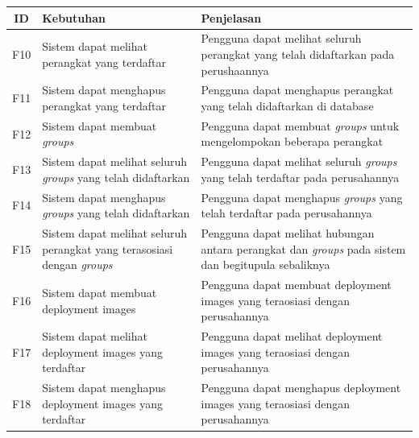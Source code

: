 \begin{table}
  \centering
  \begin{tabular}{|c|p{4.5cm}|p{8cm}|}
    \hline
    ID  & Kebutuhan                                                                      & Penjelasan                                                                                                 \\
    \hline

    \hline
    F10 & Sistem dapat melihat perangkat yang terdaftar                                  & Pengguna dapat melihat seluruh perangkat yang telah didaftarkan pada perushaannya                          \\
    \hline
    F11 & Sistem dapat menghapus perangkat yang terdaftar                                & Pengguna dapat menghapus perangkat yang telah didaftarkan di database                                      \\
    \hline
    F12 & Sistem dapat membuat \textit{groups}                                           & Pengguna dapat membuat \textit{groups} untuk mengelompokan beberapa perangkat                              \\
    \hline
    F13 & Sistem dapat melihat seluruh \textit{groups} yang telah didaftarkan            & Pengguna dapat melihat seluruh \textit{groups} yang telah terdaftar pada perusahannya                      \\
    \hline
    F14 & Sistem dapat menghapus \textit{groups} yang telah didaftarkan                  & Pengguna dapat menghapus \textit{groups} yang telah terdaftar pada perusahannya                            \\
    \hline
    F15 & Sistem dapat melihat seluruh perangkat yang terasosiasi dengan \textit{groups} & Pengguna dapat melihat hubungan antara perangkat dan \textit{groups} pada sistem dan begitupula sebaliknya \\
    \hline
    F16 & Sistem dapat membuat deployment images                                         & Pengguna dapat membuat deployment images yang teraosiasi dengan perusahannya                               \\
    \hline
    F17 & Sistem dapat melihat deployment images yang terdaftar                          & Pengguna dapat melihat deployment images yang teraosiasi dengan perusahannya                               \\
    \hline
    F18 & Sistem dapat menghapus deployment images yang terdaftar                        & Pengguna dapat menghapus deployment images yang teraosiasi dengan perusahannya                             \\

\end{tabular}
\end{table}
